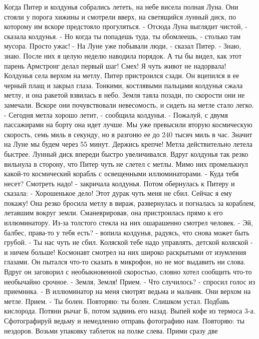     Когда Питер и колдунья собрались лететь, на небе висела полная 
Луна. Они стояли у порога хижины и смотрели вверх, на светящийся 
лунный диск, по которому им вскоре предстояло прогуляться.
    - Отсюда Луна выглядит чистой, - сказала колдунья. - Но когда ты 
попадешь туда, ты обомлеешь, - столько там мусора. Просто ужас!
    - На Луне уже побывали люди, - сказал Питер.
    - Знаю, знаю. После них я целую неделю наводила порядок. А ты бы 
видел, как этот парень Армстронг делал первый шаг! Смех! Я чуть живот 
не надорвала!
    Колдунья села верхом на метлу, Питер пристроился сзади. Он 
вцепился в ее черный плащ и закрыл глаза. Тонкими, костлявыми пальцами 
колдунья сжала метлу, и она ракетой взвилась в небо. Земля таяла 
позади, по скорости они не замечали. Вскоре они почувствовали 
невесомость, и сидеть на метле стало легко.
    - Сегодня метла хорошо летит, - сообщила колдунья. - Пожалуй, с 
двумя пассажирами на борту она идет лучше. Мы уже превысили вторую 
космическую скорость, семь миль в секунду, но я разгоню ее до 240 
тысяч миль в час. Значит на Луне мы будем через 55 минут. Держись 
крепче!
    Метла действительно летела быстрее. Лунный диск впереди быстро 
увеличивался.
    Вдруг колдунья так резко вильнула в сторону, что Питер чуть не 
слетел с метлы. Мимо них промелькнул какой-то космический корабль с 
освещенными иллюминаторами.
    - Куда тебя несет? Смотреть надо! - закричала колдунья. Потом 
обернулась к Питеру и сказала:
    - Хорошенькое дело! Этот дурак чуть меня не сбил. Сейчас я ему 
покажу!
    Она резко бросила метлу в вираж, развернулась и погналась за 
кораблем, летавшим вокруг земли. Сманеврировав, она пристроилась прямо 
к его иллюминатору. Из-за толстого стекла на них ошарашенно смотрел 
человек.
    - Эй, балбес, права-то у тебя есть? - вопила колдунья, радуясь, 
что снова может быть грубой. - Ты нас чуть не сбил. Коляской тебе надо 
управлять, детской коляской - и ничем больше!
    Космонавт смотрел на них широко раскрытыми от изумления глазами. 
Он пытался что-то сказать в микрофон, но не мог выдавить ни слова. 
Вдруг он заговорил с необыкновенной скоростью, словно хотел сообщить 
что-то необычайно срочное.
    - Земля, Земля! Прием.
    - Что случилось? - спросил голос из приемника.
    - В иллюминатор на меня смотрят ведьма и мальчик. Они верхом на 
метле. Прием.
    - Ты болен. Повторяю: ты болен. Слишком устал. Подбавь кислорода. 
Потяни рычаг Б, потом задвинь его назад. Выпей кофе из термоса 3-а. 
Сфотографируй ведьму и немедленно отправь фотографию нам. Повторяю: ты 
нездоров. Возьми упаковку таблеток на полке слева. Прими сразу две 
